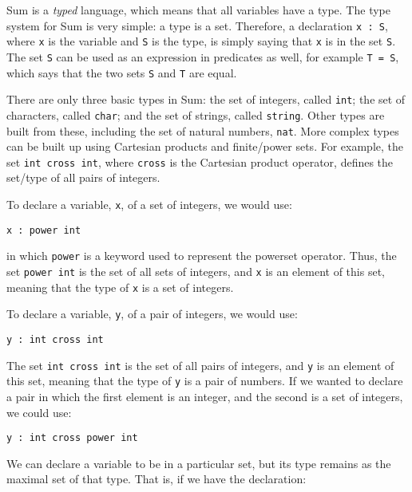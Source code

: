 Sum is a \emph{typed} language, which means that all variables have a type. The type system for Sum is very simple: a type is a set. Therefore, a declaration \texttt{x : S}, where \texttt{x} is the variable and \texttt{S} is the type, is simply saying that \texttt{x} is in the set \texttt{S}. The set \texttt{S} can be used as an expression in predicates as well, for example \texttt{T = S}, which says that the two sets \texttt{S} and \texttt{T} are equal.

There are only three basic types in Sum: the set of integers, called \texttt{int}; the set of characters, called \texttt{char}; and the set of strings, called \texttt{string}. Other types are built from these, including the set of natural numbers, \texttt{nat}. More complex types can be built up using Cartesian products and finite/power sets. For example, the set \texttt{int cross int}, where \texttt{cross} is the Cartesian product operator, defines the set/type of all pairs of integers.

\begin{example}
To declare a variable, \texttt{x}, of a set of integers, we would use:

\quad\quad \texttt{x : power int}

in which \texttt{power} is a keyword used to represent the powerset operator. Thus, the set \texttt{power int} is the set of all sets of integers, and \texttt{x} is an element of this set, meaning that the type of \texttt{x} is a set of integers.

\end{example}

\begin{example}
To declare a variable, \texttt{y}, of a pair of integers, we would use:

\quad\quad \texttt{y : int cross int}

The set \texttt{int cross int} is the set of all pairs of integers, and  \texttt{y} is an element of this set, meaning that the type of \texttt{y} is a pair of numbers. If we wanted to declare a pair in which the first element is an integer, and the second is a set of integers, we could use:

\quad\quad \texttt{y : int cross power int}

\end{example}

We can declare a variable to be in a particular set, but its type remains as the maximal set of that type. That is, if we have the declaration:

